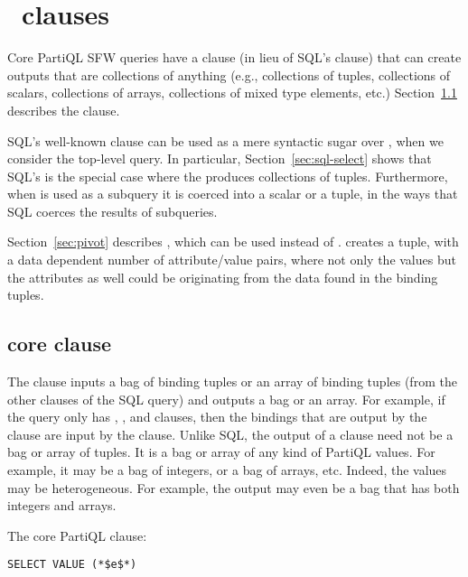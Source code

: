 \section{\select\ clauses}
\label{sec:select-values}

Core PartiQL SFW queries have a  clause (in lieu of SQL's
 clause) that can create outputs that are collections of anything
(e.g., collections of tuples, collections of scalars, collections of arrays,
collections of mixed type elements, etc.) Section~\ref{sec:select-values-core}
describes the  clause.

SQL's well-known  clause can be used as a mere syntactic sugar over
, when we consider the top-level query. In particular,
Section~\ref{sec:sql-select} shows that SQL's  is the special case
where the  produces collections of tuples. Furthermore, when
\select is used as a subquery it is coerced into a scalar or a tuple, in the
ways that SQL coerces the results of subqueries.

Section~\ref{sec:pivot} describes , which can be used
instead of .  creates a tuple, with a data
dependent number of attribute/value pairs, where not only the values but the
attributes as well could be originating from the data found in the binding
tuples.

\subsection{\select {} core clause}
\label{sec:select-values-core}
The \select {} clause inputs a bag of binding tuples or an array of
binding tuples (from the other clauses of the SQL query) and outputs a bag or an
array. For example, if the query only has \select {}, \from, and
 clauses, then the bindings that are output by the  clause
are input by the \select {} clause. Unlike SQL, the output of a \select
{} clause need not be a bag or array of tuples. It is a bag or array of
any kind of PartiQL values. For example, it may be a bag of integers, or a
bag of arrays, etc. Indeed, the values may be heterogeneous. For example, the
output may even be a bag that has both integers and arrays. 

The core PartiQL clause:

\begin{lstlisting}
SELECT VALUE (*$e$*)
\end{lstlisting}


